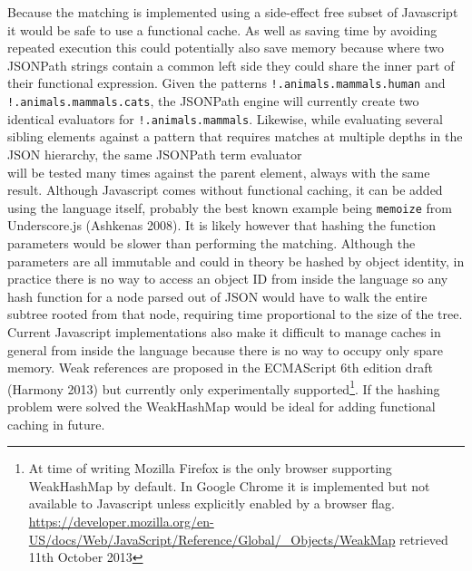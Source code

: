 \documentclass[12pt, ]{article}
\begin{document}
Because the matching is implemented using a side-effect free subset of
Javascript it would be safe to use a functional cache. As well as saving
time by avoiding repeated execution this could potentially also save
memory because where two JSONPath strings contain a common left side
they could share the inner part of their functional expression. Given
the patterns \texttt{!.animals.mammals.human} and
\texttt{!.animals.mammals.cats}, the JSONPath engine will currently
create two identical evaluators for \texttt{!.animals.mammals}.
Likewise, while evaluating several sibling elements against a pattern
that requires matches at multiple depths in the JSON hierarchy, the same
JSONPath term evaluator\\will be tested many times against the parent
element, always with the same result. Although Javascript comes without
functional caching, it can be added using the language itself, probably
the best known example being \texttt{memoize} from Underscore.js
(Ashkenas 2008). It is likely however that hashing the function
parameters would be slower than performing the matching. Although the
parameters are all immutable and could in theory be hashed by object
identity, in practice there is no way to access an object ID from inside
the language so any hash function for a node parsed out of JSON would
have to walk the entire subtree rooted from that node, requiring time
proportional to the size of the tree. Current Javascript implementations
also make it difficult to manage caches in general from inside the
language because there is no way to occupy only spare memory. Weak
references are proposed in the ECMAScript 6th edition draft (Harmony
2013) but currently only experimentally supported\footnote{At time of
  writing Mozilla Firefox is the only browser supporting WeakHashMap by
  default. In Google Chrome it is implemented but not available to
  Javascript unless explicitly enabled by a browser flag.
  \url{https://developer.mozilla.org/en-US/docs/Web/JavaScript/Reference/Global/_Objects/WeakMap}
  retrieved 11th October 2013}. If the hashing problem were solved the
WeakHashMap would be ideal for adding functional caching in future.
\end{document}

